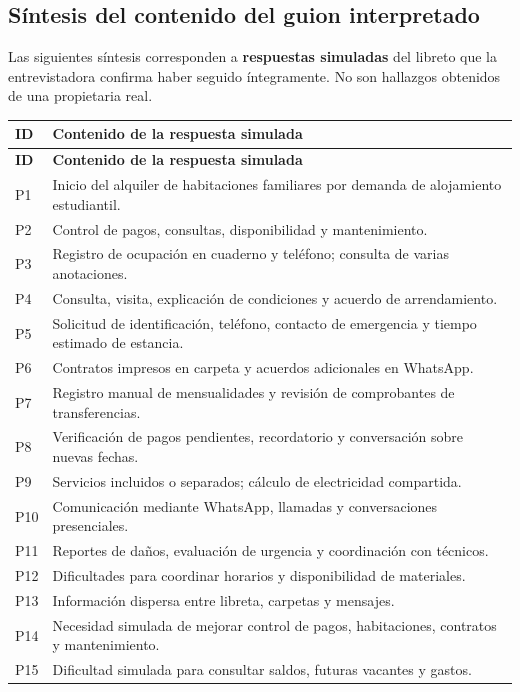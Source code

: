 \documentclass[12pt,a4paper]{article}
\renewcommand{\arraystretch}{1.12}
\begin{document}
\subsection{Síntesis del contenido del guion interpretado}
Las siguientes síntesis corresponden a \textbf{respuestas simuladas} del libreto que la entrevistadora confirma haber seguido íntegramente. No son hallazgos obtenidos de una propietaria real.
\begingroup\small\renewcommand{\arraystretch}{1.05}
\begin{longtable}{|p{1.1cm}|p{10.8cm}|}
\hline
\textbf{ID} & \textbf{Contenido de la respuesta simulada} \\ \hline
\endfirsthead
\hline \textbf{ID} & \textbf{Contenido de la respuesta simulada} \\ \hline
\endhead
P1 & Inicio del alquiler de habitaciones familiares por demanda de alojamiento estudiantil. \\ \hline
P2 & Control de pagos, consultas, disponibilidad y mantenimiento. \\ \hline
P3 & Registro de ocupación en cuaderno y teléfono; consulta de varias anotaciones. \\ \hline
P4 & Consulta, visita, explicación de condiciones y acuerdo de arrendamiento. \\ \hline
P5 & Solicitud de identificación, teléfono, contacto de emergencia y tiempo estimado de estancia. \\ \hline
P6 & Contratos impresos en carpeta y acuerdos adicionales en WhatsApp. \\ \hline
P7 & Registro manual de mensualidades y revisión de comprobantes de transferencias. \\ \hline
P8 & Verificación de pagos pendientes, recordatorio y conversación sobre nuevas fechas. \\ \hline
P9 & Servicios incluidos o separados; cálculo de electricidad compartida. \\ \hline
P10 & Comunicación mediante WhatsApp, llamadas y conversaciones presenciales. \\ \hline
P11 & Reportes de daños, evaluación de urgencia y coordinación con técnicos. \\ \hline
P12 & Dificultades para coordinar horarios y disponibilidad de materiales. \\ \hline
P13 & Información dispersa entre libreta, carpetas y mensajes. \\ \hline
P14 & Necesidad simulada de mejorar control de pagos, habitaciones, contratos y mantenimiento. \\ \hline
P15 & Dificultad simulada para consultar saldos, futuras vacantes y gastos. \\ \hline
\end{longtable}\endgroup
\end{document}
